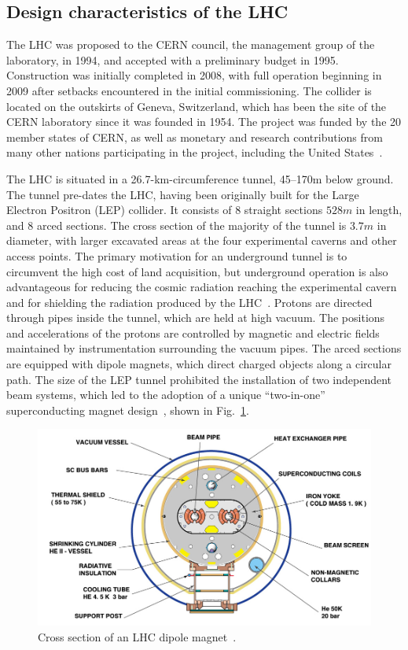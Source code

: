 \subsection{Design characteristics of the LHC}

The LHC was proposed to the CERN council, the management group of the 
laboratory, in 1994, and accepted
with a preliminary budget in 1995. Construction was initially completed in
2008, with full operation beginning in 2009 after setbacks 
encountered in the initial commissioning.
The collider is located on the outskirts
of Geneva, Switzerland, 
which has been the site of the CERN laboratory since it was founded in 1954.
The project was funded by the 20 member states of CERN, as well
as monetary and research contributions from many other nations participating 
in the project, including the United States~\cite{Schorner-Sadenius:2015dja}.

The LHC is situated in a 26.7-km-circumference tunnel, 45--170\unit{m} below ground.
The tunnel pre-dates the LHC,
having been originally built for the Large Electron Positron (LEP) collider.
It consists of 8 straight sections $528\unit{m}$ in length, and 8 arced sections.
The cross section of the majority of the tunnel is $3.7\unit{m}$ in diameter, with larger excavated
areas at the four experimental caverns and other access points.
The primary motivation for an underground tunnel is to circumvent the high
cost of land acquisition, but underground operation is also advantageous for
reducing the cosmic radiation reaching the experimental cavern and  
for shielding the radiation produced by the LHC~\cite{Evans:2008zzb}. 
Protons are directed through pipes inside the tunnel, which are held
at high vacuum. The positions and accelerations of the protons are controlled 
by magnetic and electric fields maintained by instrumentation surrounding the 
vacuum pipes. The arced sections are equipped with dipole magnets,
which direct charged objects along a circular path.
The size of the LEP tunnel prohibited the installation of two independent beam
systems, which led to the adoption of a unique ``two-in-one'' superconducting
magnet design~\cite{Blewett:1068131}, shown in Fig.~\ref{fig:dipoleXsec}. 

\begin{figure}[htbp]
  \centering
   \includegraphics[width=\textwidth]{figures/LHCandCMS/dipoleXSec.jpeg}
  \caption{
    Cross section of an LHC dipole magnet~\cite{Jean-Luc:841539}.
        }
 \label{fig:dipoleXsec}
\end{figure}

